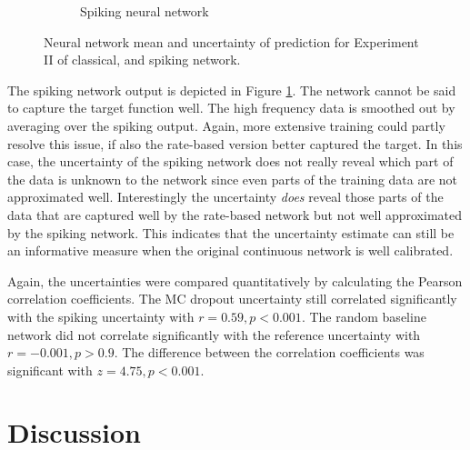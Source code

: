 \documentclass[10pt,a4paper,twocolumn]{article}
\begin{document}
\begin{figure}[t]
\begin{subfigure}[t]{0.45\textwidth}
\caption{Spiking neural network}\label{subfig:exp2_spike}
\end{subfigure}
\caption{Neural network mean and uncertainty of prediction for Experiment II of classical, and spiking network.}\label{fig:exp2}
\end{figure}

The spiking network output is depicted in Figure \ref{subfig:exp2_spike}. The network cannot be said to capture the target function well. The high frequency data is smoothed out by averaging over the spiking output. Again, more extensive training could partly resolve this issue, if also the rate-based version better captured the target. In this case, the uncertainty of the spiking network does not really reveal which part of the data is unknown to the network since even parts of the training data are not approximated well. Interestingly the uncertainty \emph{does} reveal those parts of the data that are captured well by the rate-based network but not well approximated by the spiking network. This indicates that the uncertainty estimate can still be an informative measure when the original continuous network is well calibrated. 

Again, the uncertainties were compared quantitatively by calculating the Pearson correlation coefficients. The MC dropout uncertainty still correlated significantly with the spiking uncertainty with $r = 0.59, p < 0.001$. The random baseline network did not correlate significantly with the reference uncertainty with $r = -0.001, p > 0.9$. The difference between the correlation coefficients was significant with $z = 4.75, p < 0.001$.


\section{Discussion}


\end{document}
